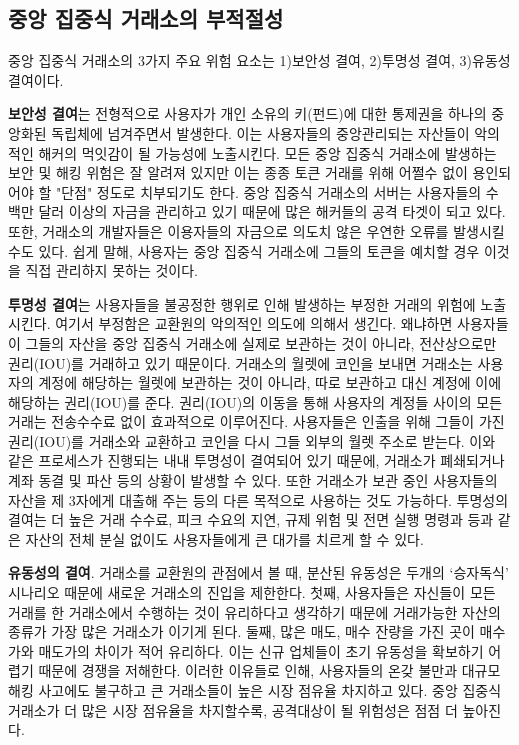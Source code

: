 \documentclass{article}
\begin{document}
\begin{multicols}{2}
\subsection{중앙 집중식 거래소의 부적절성}
중앙 집중식 거래소의 3가지 주요 위험 요소는 1)보안성 결여, 2)투명성 결여, 3)유동성 결여이다. 

\textbf{보안성 결여}는 전형적으로 사용자가 개인 소유의 키(펀드)에 대한 통제권을 하나의 중앙화된 독립체에 넘겨주면서 발생한다. 이는 사용자들의 중앙관리되는 자산들이 악의적인 해커의 먹잇감이 될 가능성에 노출시킨다. 모든 중앙 집중식 거래소에 발생하는 보안 및 해킹 위험은 잘 알려져 있지만 \cite{coincheckhack}  \cite{mcmillan2014inside} 이는 종종 토큰 거래를 위해 어쩔수 없이 용인되어야 할 "단점" 정도로 치부되기도 한다. 중앙 집중식 거래소의 서버는 사용자들의 수 백만 달러 이상의 자금을 관리하고 있기 때문에 많은 해커들의 공격 타겟이 되고 있다. 또한, 거래소의 개발자들은 이용자들의 자금으로 의도치 않은 우연한 오류를 발생시킬 수도 있다. 쉽게 말해, 사용자는 중앙 집중식  거래소에 그들의 토큰을 예치할 경우 이것을 직접 관리하지 못하는 것이다.

\textbf{투명성 결여}는 사용자들을 불공정한 행위로 인해 발생하는 부정한 거래의 위험에 노출시킨다. 여기서 부정함은 교환원의 악의적인 의도에 의해서 생긴다. 왜냐하면 사용자들이 그들의 자산을 중앙 집중식 거래소에 실제로 보관하는 것이 아니라, 전산상으로만 권리(IOU)를 거래하고 있기 때문이다. 거래소의 월렛에 코인을 보내면 거래소는 사용자의 계정에 해당하는 월렛에 보관하는 것이 아니라, 따로 보관하고 대신 계정에 이에 해당하는 권리(IOU)를 준다. 권리(IOU)의 이동을 통해 사용자의 계정들 사이의 모든 거래는 전송수수료 없이 효과적으로 이루어진다. 사용자들은 인출을 위해 그들이 가진 권리(IOU)를 거래소와 교환하고 코인을 다시 그들 외부의 월렛 주소로 받는다. 이와 같은 프로세스가 진행되는 내내 투명성이 결여되어 있기 때문에, 거래소가 폐쇄되거나 계좌 동결 및 파산 등의 상황이 발생할 수 있다. 또한 거래소가 보관 중인 사용자들의 자산을 제 3자에게 대출해 주는 등의 다른 목적으로 사용하는 것도 가능하다. 투명성의 결여는 더 높은 거래 수수료, 피크 수요의 지연, 규제 위험 및 전면 실행 명령과 등과 같은 자산의 전체 분실 없이도 사용자들에게 큰 대가를 치르게 할 수 있다.

\textbf{유동성의 결여}. 거래소를 교환원의 관점에서 볼 때, 분산된 유동성은 두개의 ‘승자독식’ 시나리오 때문에 새로운 거래소의 진입을 제한한다. 첫째, 사용자들은 자신들이 모든 거래를 한 거래소에서 수행하는 것이 유리하다고 생각하기 때문에 거래가능한 자산의 종류가 가장 많은 거래소가 이기게 된다. 둘째, 많은 매도, 매수 잔량을 가진 곳이 매수가와 매도가의 차이가 적어 유리하다. 이는 신규 업체들이 초기 유동성을 확보하기 어렵기 때문에 경쟁을 저해한다. 이러한 이유들로 인해, 사용자들의 온갖 불만과 대규모 해킹 사고에도 불구하고 큰 거래소들이 높은 시장 점유율 차지하고 있다. 중앙 집중식 거래소가 더 많은 시장 점유율을 차지할수록, 공격대상이 될 위험성은 점점 더 높아진다.


\end{multicols}
\end{document}
